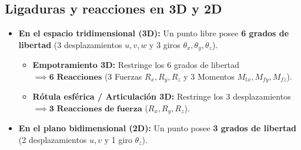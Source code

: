 \subsection{Ligaduras y reacciones en 3D y 2D}
\begin{itemize}
    \item \textbf{En el espacio tridimensional (3D):} Un punto libre posee \textbf{6 grados de libertad} (3 desplazamientos $u, v, w$ y 3 giros $\theta_x, \theta_y, \theta_z$).
          \begin{itemize}
              \item \textbf{Empotramiento 3D:} Restringe los 6 grados de libertad $\implies \mathbf{6\text{ Reacciones}}$ (3 Fuerzas $R_x, R_y, R_z$ y 3 Momentos $M_{tx}, M_{fy}, M_{fz}$).
              \item \textbf{Rótula esférica / Articulación 3D:} Restringe los 3 desplazamientos $\implies \mathbf{3\text{ Reacciones de fuerza}}$ ($R_x, R_y, R_z$).
          \end{itemize}
    \item \textbf{En el plano bidimensional (2D):} Un punto posee \textbf{3 grados de libertad} (2 desplazamientos $u, v$ y 1 giro $\theta_z$).
\end{itemize}

